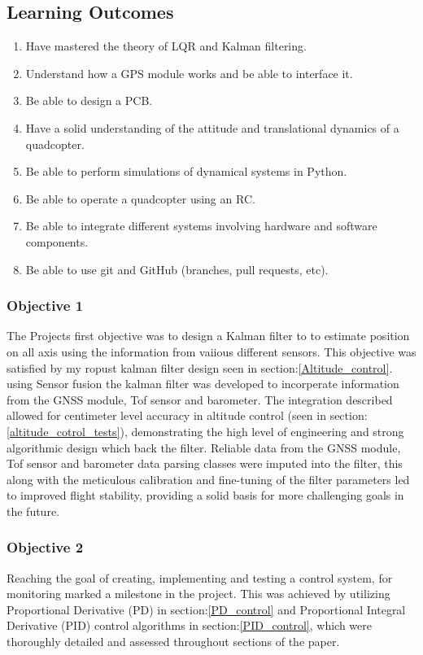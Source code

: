\documentclass{report}
\begin{document}
\subsection*{Learning Outcomes}
\begin{enumerate}
  \item Have mastered the theory of LQR and Kalman filtering.
  \item Understand how a GPS module works and be able to interface it.
  \item Be able to design a PCB.
  \item Have a solid understanding of the attitude and translational dynamics of
  a quadcopter.
  \item Be able to perform simulations of dynamical systems in Python.
  \item Be able to operate a quadcopter using an RC.
  \item Be able to integrate different systems involving hardware and software
  components.
  \item Be able to use git and GitHub (branches, pull requests, etc).
\end{enumerate}

\subsubsection*{Objective 1}
The Projects first objective was to design a Kalman filter to to estimate
position on all axis using the information from vaiious different sensors. This
objective was satisfied by my ropust  kalman filter design seen in
section:\ref{Altitude_control}. using Sensor fusion the kalman filter was
developed to incorperate information from the GNSS module, Tof sensor and
barometer. The integration described allowed for centimeter level accuracy in
altitude control (seen in section:\ref{altitude_cotrol_tests}), demonstrating
the high level of engineering and strong algorithmic design which back the
filter. Reliable data from the GNSS module, Tof sensor and barometer data
parsing classes were imputed into the filter, this along with the meticulous
calibration and fine-tuning of the filter parameters led to improved flight
stability, providing a solid basis for more challenging goals in the future.

\subsubsection*{Objective 2}
Reaching the goal of creating, implementing and testing a control system, for
monitoring marked a milestone in the project. This was achieved by utilizing
Proportional Derivative (PD) in section:\ref{PD_control} and Proportional
Integral Derivative (PID) control algorithms in section:\ref{PID_control}, which
were thoroughly detailed and assessed throughout sections of the paper.
\end{document}
